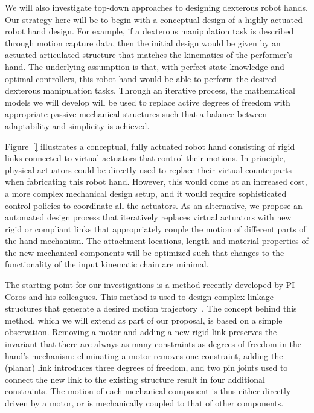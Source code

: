 We will also investigate top-down approaches to designing dexterous robot hands. Our strategy here will be to begin with a conceptual design of a highly actuated robot hand design. For example, if a dexterous manipulation task is described through motion capture data, then the initial design would be given by an actuated articulated structure that matches the kinematics of the performer's hand. The underlying assumption is that, with perfect state knowledge and optimal controllers, this robot hand would be able to perform the desired dexterous manipulation tasks. Through an iterative process, the mathematical models we will develop will be used to replace active degrees of freedom with appropriate passive mechanical structures such that a balance between adaptability and simplicity is achieved. 



Figure~\ref{} illustrates a conceptual, fully actuated robot hand consisting of rigid links connected to virtual actuators that control their motions. In principle, physical actuators could be directly used to replace their virtual counterparts when fabricating this robot hand. However, this would come at an increased cost, a more complex mechanical design setup, and it would require sophisticated control policies to coordinate all the actuators. As an alternative, we propose an automated design process that iteratively replaces virtual actuators with new rigid or compliant links that appropriately couple the motion of different parts of the hand mechanism. The attachment locations, length and material properties of the new mechanical components will be optimized such that changes to the functionality of the input kinematic chain are minimal. 

The starting point for our investigations is a method recently developed by PI Coros and his colleagues. This method is used to design complex linkage structures that generate a desired motion trajectory~\cite{Thomaszewski14CDL}. The concept behind this method, which we will extend as part of our proposal, is based on a simple observation. Removing a motor and adding a new rigid link preserves the invariant that there are always as many constraints as degrees of freedom in the hand's mechanism: eliminating a motor removes one constraint, adding the (planar) link introduces three degrees of freedom, and two pin joints used to connect the new link to the existing structure result in four additional constraints. The motion of each mechanical component is thus either directly driven by a motor, or is mechanically coupled to that of other components.

